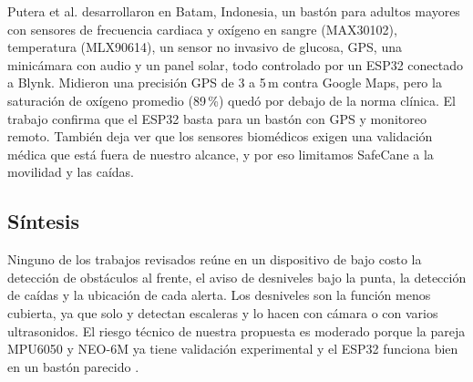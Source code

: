 \documentclass[conference,a4paper]{IEEEtran}
\begin{document}
Putera et al. \cite{putera} desarrollaron en Batam, Indonesia, un bastón para adultos mayores con sensores de frecuencia cardiaca y oxígeno en sangre (MAX30102), temperatura (MLX90614), un sensor no invasivo de glucosa, GPS, una minicámara con audio y un panel solar, todo controlado por un ESP32 conectado a Blynk. Midieron una precisión GPS de 3 a 5\,m contra Google Maps, pero la saturación de oxígeno promedio (89\,\%) quedó por debajo de la norma clínica. El trabajo confirma que el ESP32 basta para un bastón con GPS y monitoreo remoto. También deja ver que los sensores biomédicos exigen una validación médica que está fuera de nuestro alcance, y por eso limitamos SafeCane a la movilidad y las caídas.

\subsection{Síntesis}

Ninguno de los trabajos revisados reúne en un dispositivo de bajo costo la detección de obstáculos al frente, el aviso de desniveles bajo la punta, la detección de caídas y la ubicación de cada alerta. Los desniveles son la función menos cubierta, ya que solo \cite{tsantikidou} y \cite{abuelmakarem} detectan escaleras y lo hacen con cámara o con varios ultrasonidos. El riesgo técnico de nuestra propuesta es moderado porque la pareja MPU6050 y NEO-6M ya tiene validación experimental \cite{fitriandini} y el ESP32 funciona bien en un bastón parecido \cite{putera}.
\end{document}
